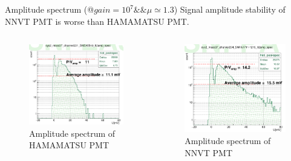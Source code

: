 \begin{frame}{Amplitude spectrum (@$gain=10^7\&\&\mu\simeq 1.3$)}
Signal amplitude stability of NNVT PMT is worse than HAMAMATSU PMT.
\vspace{-.3cm}
\begin{columns}
\begin{column}{.5\textwidth}
\begin{figure}
\centering
\includegraphics[width=\textwidth]{figures/hamampspe.png} %
\caption{Amplitude spectrum of HAMAMATSU PMT}
\end{figure}
\end{column}
\begin{column}{.5\textwidth}
\begin{figure}
\centering
\includegraphics[width=\textwidth]{figures/mcpampspe.png} %
\caption{Amplitude spectrum of NNVT PMT}
\end{figure}
\end{column}
\end{columns}
\end{frame}
